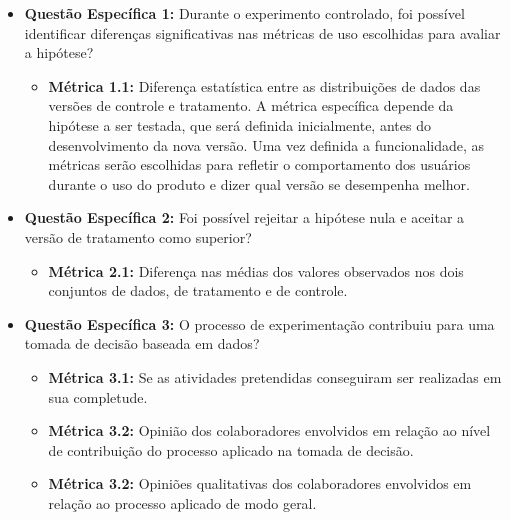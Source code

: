 \begin{itemize}
    \item \textbf{Questão Específica 1:} Durante o experimento controlado, foi possível identificar diferenças significativas nas métricas de uso escolhidas para avaliar a hipótese?

    \begin{itemize}
        \item \textbf{Métrica 1.1:} Diferença estatística entre as distribuições de dados das versões de controle e tratamento. A métrica específica depende da hipótese a ser testada, que será definida inicialmente, antes do desenvolvimento da nova versão. Uma vez definida a funcionalidade, as métricas serão escolhidas para refletir o comportamento dos usuários durante o uso do produto e dizer qual versão se desempenha melhor. 
    \end{itemize}
    
    \item \textbf{Questão Específica 2:} Foi possível rejeitar a hipótese nula e aceitar a versão de tratamento como superior?

    \begin{itemize}
        \item \textbf{Métrica 2.1:} Diferença nas médias dos valores observados nos dois conjuntos de dados, de tratamento e de controle.
    \end{itemize}
  
    \item \textbf{Questão Específica 3:} O processo de experimentação contribuiu para uma tomada de decisão baseada em dados?

    \begin{itemize}
        \item \textbf{Métrica 3.1:} Se as atividades pretendidas conseguiram ser realizadas em sua completude.
    \end{itemize}

    \begin{itemize}
        \item \textbf{Métrica 3.2:} Opinião dos colaboradores envolvidos em relação ao nível de contribuição do processo aplicado na tomada de decisão.
    \end{itemize}

    \begin{itemize}
        \item \textbf{Métrica 3.2:} Opiniões qualitativas dos colaboradores envolvidos em relação ao processo aplicado de modo geral.
    \end{itemize}
    
\end{itemize}

